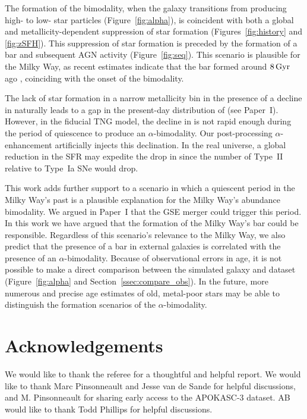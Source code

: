 The formation of the bimodality, when the galaxy transitions from producing high- to low-\MgFe{} star particles (Figure~\ref{fig:alpha}), is coincident with both a global and metallicity-dependent suppression of star formation (Figures~\ref{fig:history} and \ref{fig:zSFH}). This suppression of star formation is preceded by the formation of a bar and subsequent AGN activity (Figure~\ref{fig:seq}). This scenario is plausible for the Milky Way, as recent estimates indicate that the bar formed around $8\,\textrm{Gyr}$ ago \citep{2019MNRAS.490.4740B,2024MNRAS.530.2972S}, coinciding with the onset of the bimodality.

The lack of star formation in a narrow metallicity bin in the presence of a decline in \MgFe{} naturally leads to a gap in the present-day distribution of \MgFe{} (see Paper~I). However, in the fiducial TNG  model, the decline in \MgFe{} is not rapid enough during the period of quiescence to produce an $\alpha$-bimodality. Our post-processing $\alpha$-enhancement artificially injects this declination. In the real universe, a global reduction in the SFR may expedite the drop in \MgFe{} since the number of Type~II relative to Type~Ia SNe would drop.

This work adds further support to a scenario in which a quiescent period in the Milky Way's past is a plausible explanation for the Milky Way's abundance bimodality. We argued in Paper~I that the GSE merger could trigger this period. In this work we have argued that the formation of the Milky Way's bar could be responsible. Regardless of this scenario's relevance to the Milky Way, we also predict that the presence of a bar in external galaxies is correlated with the presence of an $\alpha$-bimodality. Because of observational errors in age, it is not possible to make a direct comparison between the simulated galaxy and dataset (Figure~\ref{fig:alpha} and Section~\ref{ssec:compare_obs}). In the future, more numerous and precise age estimates of old, metal-poor stars may be able to distinguish the formation scenarios of the $\alpha$-bimodality.

\section{Acknowledgements}
We would like to thank the referee for a thoughtful and helpful report. We would like to thank Marc Pinsonneault and Jesse van de Sande for helpful discussions, and M. Pinsonneault for sharing early access to the APOKASC-3 dataset. AB would like to thank Todd Phillips for helpful discussions.

